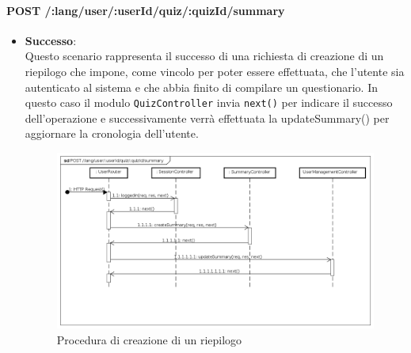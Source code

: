 \paragraph{POST /:lang/user/:userId/quiz/:quizId/summary} %
\begin{itemize}
\item \textbf{Successo}:\\
Questo scenario rappresenta il successo di una richiesta di creazione di un riepilogo che impone, come vincolo per poter essere effettuata, che l'utente sia autenticato al sistema e che abbia finito di compilare un questionario. In questo caso il modulo \texttt{QuizController} invia \texttt{next()} per indicare il successo dell'operazione e successivamente verrà effettuata la updateSummary() per aggiornare la cronologia dell'utente.
\label{Procedura di creazione di un riepilogo}
\begin{figure}[ht]
	\centering
	\includegraphics[scale=0.40]{UML/DiagrammiDiSequenza/Back-end/POST__lang_user_userId_quiz_quizId_summary_success.png}
	\caption{Procedura di creazione di un riepilogo}
\end{figure}
\FloatBarrier


\end{itemize}
